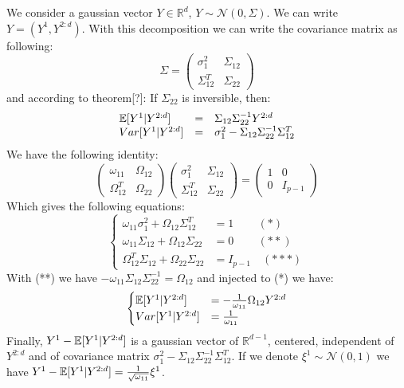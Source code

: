 \documentclass[12pt]{article}
\let\bb\mathbb       %
\def\RR{{\bb R}}\def\ZZ{{\bb Z}}\def\FF{{\bb F}}\def\DD{{\bb D}}
\def\bb{\mathbb}
\begin{document}
We consider a gaussian vector $Y\in \RR^d$, $Y \sim \mathcal N(0,\Sigma)$. We can write $Y=(Y^1,Y^{2:d})$. With this decomposition we can write the covariance matrix as following:
\begin{equation}
\Sigma=
 \begin{pmatrix}
\sigma_1^2 & \Sigma_{12}\\
\Sigma_{12}^T & \Sigma_{22}
\end{pmatrix}
\end{equation}
and according to theorem[?]: If $\Sigma_{22}$ is inversible, then:
\begin{equation}
\begin{array}{lcl}
\EE[Y^1|Y^{2:d}]&=&\Sigma_{12}\Sigma_{22}^{-1}Y^{2:d}\\
Var[Y^1|Y^{2:d}]&=&\sigma_1^2-\Sigma_{12}\Sigma_{22}^{-1}\Sigma_{12}^T
\end{array}
\end{equation}
We have the following identity:
\begin{equation}
 \begin{pmatrix}
 \omega_{11}&\Omega_{12}\\
 \Omega_{12}^T&\Omega_{22}
\end{pmatrix}
 \begin{pmatrix}
 \sigma_{1}^2&\Sigma_{12}\\
 \Sigma_{12}^T&\Sigma_{22}
\end{pmatrix}
=
 \begin{pmatrix}
 1&0\\
0&I_{p-1}
\end{pmatrix}
\end{equation}
Which gives the following equations:
\begin{equation}
  \begin{cases}
  \omega_{11}\sigma_1^2+\Omega_{12}\Sigma_{12}^T&=1\quad\,\quad(*) \\
  \omega_{11}\Sigma_{12}+\Omega_{12}\Sigma_{22}&=0\quad\,\quad(**)\\
  \Omega_{12}^T\Sigma_{12}+\Omega_{22}\Sigma_{22}&=I_{p-1}\quad(***)
  \end{cases}
\end{equation}
With (**) we have $-\omega_{11}\Sigma_{12}\Sigma_{22}^{-1}=\Omega_{12}$ and injected to (*) we have:
\begin{equation}
 \begin{cases}
 \EE[Y^1|Y^{2:d}]&=-\frac{1}{\omega_{11}}\Omega_{12}Y^{2:d}\\
  Var[Y^1|Y^{2:d}]&=\frac{1}{\omega_{11}}
  \end{cases}
\end{equation}
Finally, $Y^1-\EE[Y^1|Y^{2:d}]$ is a gaussian vector of $\RR^{d-1}$, centered, independent of $Y^{2:d}$ and of covariance matrix $\sigma_1^2-\Sigma_{12}\Sigma_{22}^{-1}\Sigma_{12}^T$. If we denote  $\xi^1\sim \mathcal N(0,1)$ we have $Y^1-\EE[Y^1|Y^{2:d}]=\frac{1}{ \sqrt{\omega_{11}}}\xi^1$.\\
\end{document}
